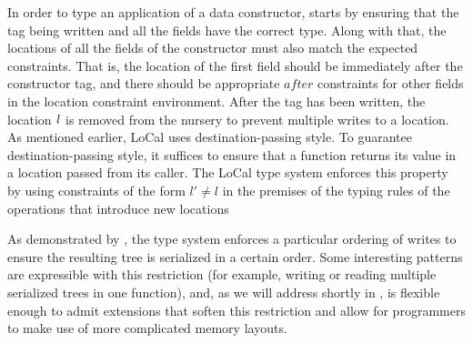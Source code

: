 \documentclass[showabstract,showacknowledgments,showpreface,showdedication]{iuphd}
\theoremstyle{nonumberplain}
\begin{document}


In order to type an application of a data constructor, \textsc{\tdatacon} starts by
ensuring that the tag being written and all the fields have the correct type.
Along with that, the locations of all the fields of the constructor must
also match the expected constraints. That is, the location of the first field
should be immediately after the constructor tag, and there should be
appropriate $\mathit{after}$ constraints for other fields in the location constraint environment.
After the tag has been written, the location $\mathit{l}$ is removed from the
nursery to prevent multiple writes to a location.
%
{
%
As mentioned earlier, LoCal uses destination-passing style. To guarantee destination-passing
style, it suffices to ensure that a function returns its value in a location passed from its caller.
The LoCal type system enforces this property by using constraints of the form $l' \neq l$ in the premises
of the typing rules of the operations that introduce new locations
}

{As demonstrated by \textsc{\tdatacon}, the type system enforces a
  particular ordering of writes to ensure the resulting tree is
  serialized in a certain order. Some interesting patterns are
  expressible with this restriction (for example, writing or reading
  multiple serialized trees in one function), and, as we will address
  shortly in , \ourcalc is flexible enough
  to admit extensions that soften this restriction and allow for
  programmers to make use of more complicated memory layouts.}
\end{document}
